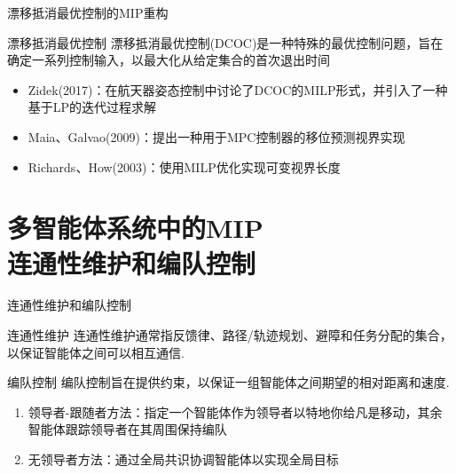 \documentclass[notheorems,11pt]{beamer}
\theoremstyle{plain}
\numberwithin{theorem}{section}
\numberwithin{lemma}{section}
\numberwithin{corollary}{section}
\theoremstyle{example}
\begin{document}
\begin{frame}{漂移抵消最优控制的MIP重构}
  \begin{block}{漂移抵消最优控制}
    漂移抵消最优控制(DCOC)是一种特殊的最优控制问题，旨在确定一系列控制输入，以最大化从给定集合的首次退出时间
  \end{block}
  \begin{itemize}
    \item Zidek(2017)：在航天器姿态控制中讨论了DCOC的MILP形式，并引入了一种基于LP的迭代过程求解
    \item Maia、Galvao(2009)：提出一种用于MPC控制器的移位预测视界实现
    \item Richards、How(2003)：使用MILP优化实现可变视界长度
  \end{itemize}
\end{frame}


\section{多智能体系统中的MIP\\连通性维护和编队控制}

\begin{frame}{连通性维护和编队控制}
  \begin{block}{连通性维护}
    连通性维护通常指反馈律、路径/轨迹规划、避障和任务分配的集合，以保证智能体之间可以相互通信.
  \end{block}
  \begin{block}{编队控制}
    编队控制旨在提供约束，以保证一组智能体之间期望的相对距离和速度.
  \end{block}
  \begin{enumerate}
    \item 领导者-跟随者方法：指定一个智能体作为领导者以特地你给凡是移动，其余智能体跟踪领导者在其周围保持编队
    \item 无领导者方法：通过全局共识协调智能体以实现全局目标
  \end{enumerate}\par
\end{frame}
\end{document}
